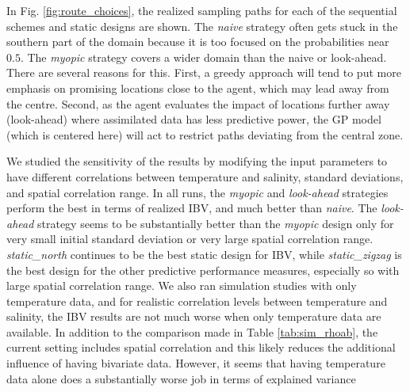 In Fig. \ref{fig:route_choices}, the realized sampling paths for each
of the sequential schemes and static designs are shown. The
\textit{naive} strategy often gets stuck in the southern part of the
domain because it is too focused on the probabilities near $0.5$. The
\textit{myopic} strategy covers a wider domain than the naive or
look-ahead. There are several reasons for this. First, a greedy
approach will tend to put more emphasis on promising locations close
to the agent, which may lead away from the centre. Second, as the
agent evaluates the impact of locations further away (look-ahead)
where assimilated data has less predictive power, the GP model (which
is centered here) will act to restrict paths deviating from the
central zone.

We studied the sensitivity of the results by modifying the input
parameters to have different correlations between temperature and
salinity, standard deviations, and spatial correlation range.  In all
runs, the \textit{myopic} and \textit{look-ahead} strategies perform
the best in terms of realized IBV, and much better than
\textit{naive}. The \textit{look-ahead} strategy seems to be
substantially better than the \textit{myopic} design only for very
small initial standard deviation or very large spatial correlation
range. \textit{static\_north} continues to be the best static design
for IBV, while \textit{static\_zigzag} is the best design for the
other predictive performance measures, especially so with large
spatial correlation range. We also ran simulation studies with only
temperature data, and for realistic correlation levels between
temperature and salinity, the IBV results are not much worse when only
temperature data are available. In addition to the comparison made in
Table \ref{tab:sim_rhoab}, the current setting includes spatial
correlation and this likely reduces the additional influence of having
bivariate data. However, it seems that having temperature data alone
does a substantially worse job in terms of explained variance